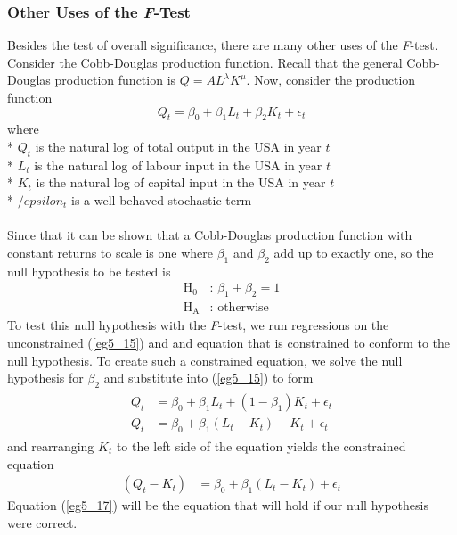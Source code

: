 \documentclass[11pt]{article}
\begin{document}
\subsubsection{Other Uses of the \textit{F}-Test}
Besides the test of overall significance, there are many other uses of the \textit{F}-test. Consider the Cobb-Douglas production function. Recall that the general Cobb-Douglas production function is $Q=AL^\lambda K^\mu$. Now, consider the production function
\begin{equation}
\label{eg5_15}
Q_t = \beta_0 + \beta_1L_t + \beta_2K_t + \epsilon_t
\end{equation}
where\\*
$Q_t$ is the natural log of total output in the USA in year $t$\\*
$L_t$ is the natural log of labour input in the USA in year $t$\\*
$K_t$ is the natural log of capital input in the USA in year $t$\\*
$/epsilon_t$ is a well-behaved stochastic term\\ \\
Since that it can be shown that a Cobb-Douglas production function with constant returns to scale is one where $\beta_1$ and $\beta_2$ add up to exactly one, so the null hypothesis to be tested is
\begin{align*}
 \text{H}_0 & \text{: }\beta_1+\beta_2 = 1\\ 
 \text{H}_\text{A} & \text{: } \text{otherwise}
\end{align*}
To test this null hypothesis with the \textit{F}-test, we run regressions on the unconstrained (\ref{eg5_15}) and and equation that is constrained to conform to the null hypothesis. To create such a constrained equation, we solve the null hypothesis for $\beta_2$ and substitute into (\ref{eg5_15}) to form
\begin{align}
\begin{split}
Q_t &= \beta_0 + \beta_1L_t + (1- \beta_1)K_t + \epsilon_t\\
Q_t &= \beta_0 + \beta_1(L_t - K_t) + K_t + \epsilon_t
\end{split}
\label{eg5_16}
\end{align}
and rearranging $K_t$ to the left side of the equation yields the constrained equation
\begin{align}
(Q_t-K_t) &= \beta_0 + \beta_1(L_t -K_t) + \epsilon_t \label{eg5_17}
\end{align}
Equation (\ref{eg5_17}) will be the equation that will hold if our null hypothesis were correct. \\ \\
\end{document}
